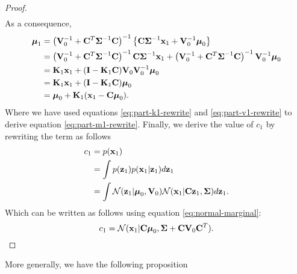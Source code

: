 \documentclass[11pt]{article}
\numberwithin{equation}{section}
\newcommand{\x}{{\bf x}}
\newcommand{\z}{{\bf z}}
\newcommand{\N}{\mathcal{N}}
\begin{document}
\begin{proof}
\begin{align}
	\end{align}
	As a consequence,
	\begin{align}
		\boldsymbol{\mu}_1 &= \left({\bf V}_0^{-1} + {\bf C}^T\boldsymbol{\Sigma}^{-1} {\bf C}\right)^{-1} \left\{{\bf C}\boldsymbol\Sigma^{-1}\x_1 + {\bf V}_0^{-1}\boldsymbol\mu_0\right\}\\
		&= \left({\bf V}_0^{-1} + {\bf C}^T\boldsymbol{\Sigma}^{-1} {\bf C}\right)^{-1} {\bf C}\boldsymbol\Sigma^{-1}\x_1 + \left({\bf V}_0^{-1} + {\bf C}^T\boldsymbol{\Sigma}^{-1} {\bf C}\right)^{-1} {\bf V}_0^{-1}\boldsymbol\mu_0\\
		&= {\bf K}_1\x_1 + ({\bf I} - {\bf K}_1{\bf C}){\bf V}_0 {\bf V}_0^{-1}\boldsymbol\mu_0 \label{eq:part-m1-rewrite}\\
		&= {\bf K}_1\x_1 + ({\bf I} - {\bf K}_1{\bf C})\boldsymbol\mu_0 \\
		&= \boldsymbol{\mu}_0 + {\bf K}_1(\x_1 -{\bf C}\boldsymbol\mu_0).
	\end{align}
	Where we have used equations \eqref{eq:part-k1-rewrite} and \eqref{eq:part-v1-rewrite} to derive equation \eqref{eq:part-m1-rewrite}.
	Finally, we derive the value of $c_1$ by rewriting the term as follows
	\begin{align}
		c_1 &= p(\x_1)\\
			&= \int p(\z_1) p (\x_1 \vert \z_1) d\z_1\\
			&= \int \N(\z_1\vert \boldsymbol\mu_0, {\bf V}_0) \N(\x_1 \vert {\bf C}\z_1, \boldsymbol\Sigma) d\z_1.
	\end{align}
	Which can be written as follows using equation \eqref{eq:normal-marginal}:
	\begin{equation}
		c_1 = \N(\x_1 \vert {\bf C}\boldsymbol\mu_0, \boldsymbol\Sigma + {\bf C}{\bf V}_0 {\bf C}^T).
	\end{equation}
\end{proof}

More generally, we have the following proposition
\end{document}
